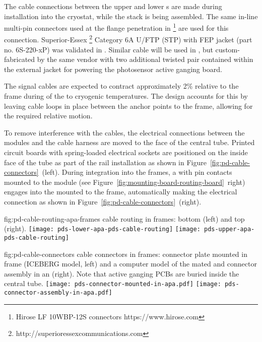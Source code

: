 
The cable connections between the upper and lower s are made during  installation into the cryostat, while the  stack is being assembled. The same in-line multi-pin connectors used at the flange penetration in \footnote{Hirose LF 10WBP-12S connectors https://www.hirose.com} are used for this connection.  Superior-Essex \footnote{http://superioressexcommunications.com} Category 6A U/FTP (STP) with FEP jacket (part no. 6S-220-xP) was validated in .  Similar cable will be used in , but custom-fabricated by the same vendor with two additional twisted pair contained within the external jacket for powering the photosensor active ganging board.

The  signal cables are expected to contract approximately 2\% relative to the  frame during \cooldown of the  to cryogenic temperatures.  The design accounts for this by leaving cable loops in place between the anchor points to the  frame, allowing for the required relative motion.

To remove interference with the  cables, the electrical connections between the  modules and the  cable harness are moved to the face of the central  tube.  Printed circuit boards with spring-loaded electrical sockets are positioned on the inside face of the tube as part of the  rail installation as shown in Figure~\ref{fig:pd-cable-connectors}~(left).  During  integration into the  frames, a  with pin contacts mounted to the  module (see Figure~\ref{fig:mounting-board-routing-board}~right) engages into the  mounted to the  frame, automatically making the electrical connection as shown in 
Figure~\ref{fig:pd-cable-connectors}~(right).

\begin{dunefigure}
{fig:pd-cable-routing-apa-frames}
{ cable routing in  frames: bottom  (left) and top  (right).}
	\texttt{[image: pds-lower-apa-pds-cable-routing]}
	\texttt{[image: pds-upper-apa-pds-cable-routing]}
	\vspace{-1.5cm}
\end{dunefigure}

\begin{dunefigure}{fig:pd-cable-connectors}
{ cable connectors in  frames:  connector plate mounted in  frame (ICEBERG model, left) and a computer model of the mated  and connector assembly in an  (right).  Note that active ganging PCBs are buried inside the central tube.}
	\texttt{[image: pds-connector-mounted-in-apa.pdf]}
	\texttt{[image: pds-connector-assembly-in-apa.pdf]}
\end{dunefigure}

